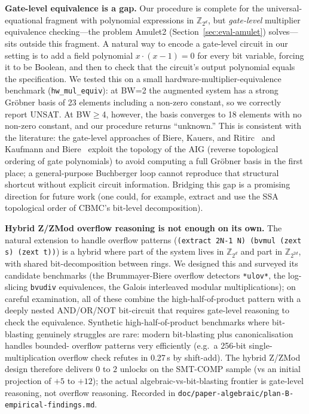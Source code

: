 \documentclass[runningheads]{llncs}
\newcommand{\cbmc}{\textsc{CBMC}\xspace}
\begin{document}
\textbf{Gate-level equivalence is a gap.} Our procedure is
complete for the universal-equational fragment with polynomial
expressions in $\mathbb{Z}_{2^d}$, but \emph{gate-level}
multiplier equivalence checking---the problem
Amulet2 (Section~\ref{sec:eval-amulet}) solves---sits outside
this fragment. A natural way to encode a gate-level circuit in
our setting is to add a field polynomial $x \cdot (x - 1) = 0$
for every bit variable, forcing it to be Boolean, and then to
check that the circuit's output polynomial equals the
specification. We
tested this on a small hardware-multiplier-equivalence benchmark
(\texttt{hw\_mul\_equiv}): at BW=2 the augmented system has
a strong Gr\"obner basis of 23 elements including a non-zero constant,
so we correctly report UNSAT. At BW$\geq$4, however, the basis
converges to 18 elements with no non-zero constant, and our procedure
returns ``unknown.'' This is consistent with the literature: the
gate-level approaches of
Biere, Kauers, and Ritirc~\cite{biere2017challenges} and
Kaufmann and Biere~\cite{kaufmann2021amulet} exploit the topology
of the AIG (reverse topological ordering of gate polynomials) to
avoid computing a full Gr\"obner basis in the first place; a
general-purpose Buchberger loop cannot reproduce that structural
shortcut without explicit circuit information. Bridging this gap
is a promising direction for future work (one could, for example,
extract and use the SSA topological order of \cbmc's bit-level
decomposition).

\textbf{Hybrid Z/ZMod overflow reasoning is not enough on its
own.} The natural extension to handle overflow patterns
(\texttt{(extract 2N-1 N) (bvmul (zext s) (zext t))}) is a
hybrid where part of the system lives in $\mathbb{Z}_{2^d}$ and
part in $\mathbb{Z}_{2^{2d}}$, with shared bit-decomposition
between rings. We designed this and surveyed its candidate
benchmarks (the Brummayer-Biere overflow detectors
\texttt{*ulov*}, the log-slicing \texttt{bvudiv} equivalences,
the Galois interleaved modular multiplications); on careful
examination, all of these
combine the high-half-of-product pattern with a deeply nested
AND/OR/NOT bit-circuit that requires gate-level reasoning to
check the equivalence. Synthetic high-half-of-product
benchmarks where bit-blasting genuinely struggles are rare:
modern bit-blasting plus canonicalisation handles bounded-
overflow patterns very efficiently (e.g.\ a 256-bit
single-multiplication overflow check refutes in 0.27\,s by
shift-add). The hybrid Z/ZMod design therefore delivers $0$ to
$2$ unlocks on the SMT-COMP sample (vs an initial projection of
$+5$ to $+12$); the actual algebraic-vs-bit-blasting frontier
is gate-level reasoning, not overflow reasoning. Recorded in
\texttt{doc/paper-algebraic/plan-B-empirical-findings.md}.
\end{document}
